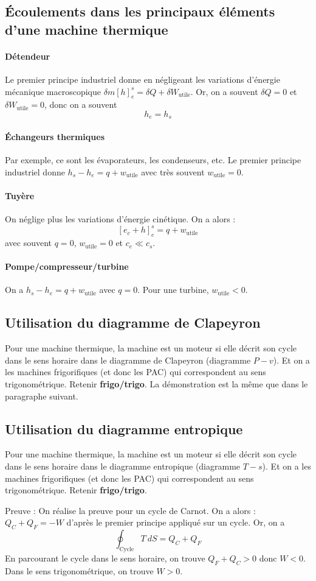 \documentclass[french]{book}
\theoremstyle{plain}
\theoremstyle{definition}
\theoremstyle{remark}
\begin{document}
\subsection{Écoulements dans les principaux éléments d'une machine thermique}
\paragraph{Détendeur} Le premier principe industriel donne en négligeant les variations d'énergie mécanique macroscopique $\delta m\left[h\right]_e^s=\delta Q+\delta W_\text{utile}$. Or, on a souvent $\delta Q=0$ et $\delta W_\text{utile}=0$, donc on a souvent $$h_e=h_s$$
\paragraph{Échangeurs thermiques} Par exemple, ce sont les évaporateurs, les condenseurs, etc. Le premier principe industriel donne $h_s-h_e=q+w_\text{utile}$ avec très souvent $w_\text{utile}=0$.
\paragraph{Tuyère} On néglige plus les variations d'énergie cinétique. On a alors : $$\left[e_c+h\right]_e^s=q+w_\text{utile}$$ avec souvent $q=0$, $w_\text{utile}=0$ et $c_e\ll c_s$.
\paragraph{Pompe/compresseur/turbine} On a $h_s-h_e=q+w_\text{utile}$ avec $q=0$. Pour une turbine, $w_\text{utile}<0$.

\subsection{Utilisation du diagramme de Clapeyron}
Pour une machine thermique, la machine est un moteur si elle décrit son cycle dans le sens horaire dans le diagramme de Clapeyron (diagramme $P-v$). Et on a les machines frigorifiques (et donc les PAC) qui correspondent au sens trigonométrique. Retenir \textbf{frigo/trigo}. La démonstration est la même que dans le paragraphe suivant.
\subsection{Utilisation du diagramme entropique}
Pour une machine thermique, la machine est un moteur si elle décrit son cycle dans le sens horaire dans le diagramme entropique (diagramme $T-s$). Et on a les machines frigorifiques (et donc les PAC) qui correspondent au sens trigonométrique. Retenir \textbf{frigo/trigo}. \\ \par Preuve : On réalise la preuve pour un cycle de Carnot. On a alors : $Q_C+Q_F=-W$ d'après le premier principe appliqué sur un cycle. Or, on a $$\oint_{\text{Cycle}}T\ dS=Q_C+Q_F$$ En parcourant le cycle dans le sens horaire, on trouve $Q_F+Q_C>0$ donc $W<0$. Dans le sens trigonométrique, on trouve $W>0$.
\end{document}
